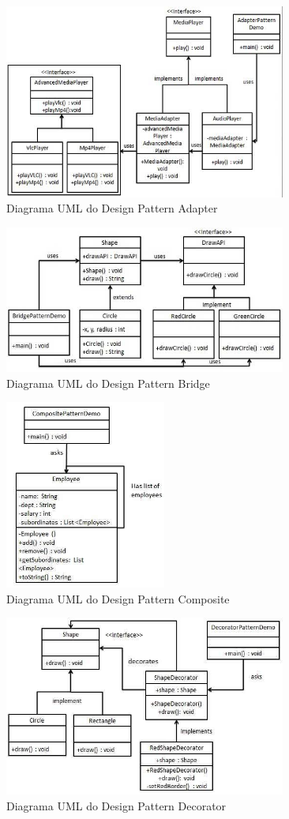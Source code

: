 \begin{figure}[H]
	\centering
	\includegraphics[width = 350px]{figuras/adapter_pattern_uml_diagram}
	\caption {Diagrama UML do Design Pattern Adapter}
	\label{fig:dp_adapter}
\end{figure}
\begin{figure}[H]
	\centering
	\includegraphics[width = 350px]{figuras/bridge_pattern_uml_diagram}
	\caption {Diagrama UML do Design Pattern Bridge}
	\label{fig:dp_bridge}
\end{figure}
\begin{figure}[H]
	\centering
	\includegraphics[width = 200px]{figuras/composite_pattern_uml_diagram}
	\caption {Diagrama UML do Design Pattern Composite}
	\label{fig:dp_composite}
\end{figure}
\begin{figure}[H]
	\centering
	\includegraphics[width = 350px]{figuras/decorator_pattern_uml_diagram}
	\caption {Diagrama UML do Design Pattern Decorator}
	\label{fig:dp_decorator}
\end{figure}
